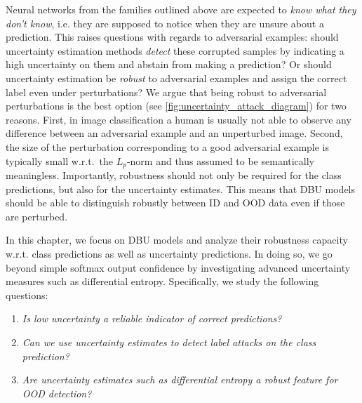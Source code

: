Neural networks from the families outlined above are expected to \emph{know what they don't know}, i.e. they are supposed to notice when they are unsure about a prediction. 
This raises questions with regards to adversarial examples: should uncertainty estimation methods \emph{detect} these corrupted samples by indicating a high uncertainty on them and abstain from making a prediction? Or should uncertainty estimation be \emph{robust} to adversarial examples and assign the correct label even under perturbations? We argue that being robust to adversarial perturbations is the best option (see \cref{fig:uncertainty_attack_diagram}) for two reasons. First, in image classification a human is usually not able to observe any difference between an adversarial example and an unperturbed image. Second, the size of the perturbation corresponding to a good adversarial example is typically small w.r.t.\ the $L_p$-norm and thus assumed to be semantically meaningless. 
Importantly, robustness should not only be required for the class predictions, but also for the uncertainty estimates. This means that DBU models should be able to distinguish robustly between ID and OOD data even if those are perturbed. 

In this chapter, we focus on DBU models and analyze their robustness capacity w.r.t. class predictions as well as uncertainty predictions. In doing so, we go beyond simple softmax output confidence by investigating advanced uncertainty measures such as differential entropy.
Specifically, we study the following questions: 
%
\begin{enumerate}
    \item \emph{Is low uncertainty a reliable indicator of correct predictions?}
    \item \emph{Can we use uncertainty estimates to detect label attacks on the class prediction?}
    \item \emph{Are uncertainty estimates such as differential entropy a robust feature for OOD detection?}
\end{enumerate}

